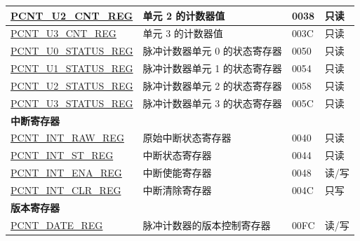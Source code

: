 \begin{longtable}{ | p{6cm} | p{7.2cm} | p{1.3cm} | p{1cm} | }
\hyperref[regdesc:PCNTUNCNTREG]{PCNT\_U2\_CNT\_REG} & 单元 2 的计数器值 & \hexprefix{}0038 & 只读 \\ \hline
\hyperref[regdesc:PCNTUNCNTREG]{PCNT\_U3\_CNT\_REG} & 单元 3 的计数器值 & \hexprefix{}003C & 只读 \\ \hline
\hyperref[regdesc:PCNTUNSTATUSREG]{PCNT\_U0\_STATUS\_REG} & 脉冲计数器单元 0 的状态寄存器 & \hexprefix{}0050 & 只读 \\ \hline
\hyperref[regdesc:PCNTUNSTATUSREG]{PCNT\_U1\_STATUS\_REG} & 脉冲计数器单元 1 的状态寄存器 & \hexprefix{}0054 & 只读 \\ \hline
\hyperref[regdesc:PCNTUNSTATUSREG]{PCNT\_U2\_STATUS\_REG} & 脉冲计数器单元 2 的状态寄存器 & \hexprefix{}0058 & 只读 \\ \hline
\hyperref[regdesc:PCNTUNSTATUSREG]{PCNT\_U3\_STATUS\_REG} & 脉冲计数器单元 3 的状态寄存器 & \hexprefix{}005C & 只读 \\ \hline
\multicolumn{4}{|l|}{\textbf{中断寄存器}} \\ \hline
\hyperref[regdesc:PCNTINTRAWREG]{PCNT\_INT\_RAW\_REG} & 原始中断状态寄存器 & \hexprefix{}0040 & 只读 \\ \hline
\hyperref[regdesc:PCNTINTSTREG]{PCNT\_INT\_ST\_REG} & 中断状态寄存器 & \hexprefix{}0044 & 只读 \\ \hline
\hyperref[regdesc:PCNTINTENAREG]{PCNT\_INT\_ENA\_REG} & 中断使能寄存器 & \hexprefix{}0048 & 读/写 \\ \hline
\hyperref[regdesc:PCNTINTCLRREG]{PCNT\_INT\_CLR\_REG} & 中断清除寄存器 & \hexprefix{}004C & 只写 \\ \hline
\multicolumn{4}{|l|}{\textbf{版本寄存器}} \\ \hline
\hyperref[regdesc:PCNTDATEREG]{PCNT\_DATE\_REG} & 脉冲计数器的版本控制寄存器 & \hexprefix{}00FC & 读/写 \\ \hline
\end{longtable}
